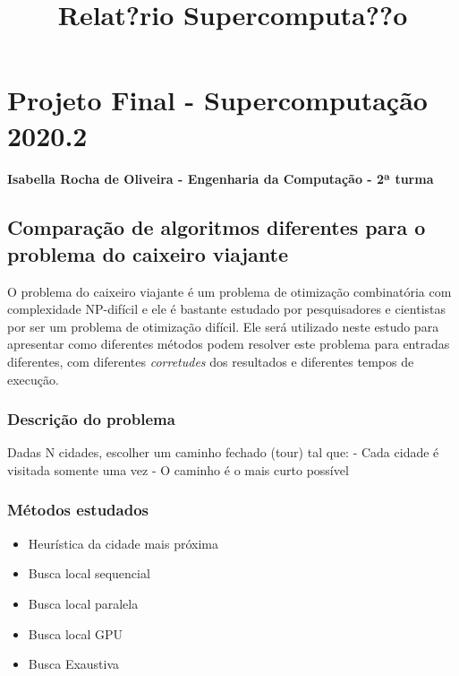 \documentclass[11pt]{article}
\title{Relat?rio Supercomputa??o}
\providecommand{\tightlist}{%
      \setlength{\itemsep}{0pt}\setlength{\parskip}{0pt}}
\begin{document}
    
    
    \maketitle
    
    

    
    \section{Projeto Final - Supercomputação
2020.2}\label{projeto-final---supercomputauxe7uxe3o-2020.2}

\paragraph{Isabella Rocha de Oliveira - Engenharia da Computação - 2ª
turma}\label{isabella-rocha-de-oliveira---engenharia-da-computauxe7uxe3o---2uxaa-turma}

\subsection{Comparação de algoritmos diferentes para o problema do
caixeiro
viajante}\label{comparauxe7uxe3o-de-algoritmos-diferentes-para-o-problema-do-caixeiro-viajante}

O problema do caixeiro viajante é um problema de otimização combinatória
com complexidade NP-difícil e ele é bastante estudado por pesquisadores
e cientistas por ser um problema de otimização difícil. Ele será
utilizado neste estudo para apresentar como diferentes métodos podem
resolver este problema para entradas diferentes, com diferentes
\emph{corretudes} dos resultados e diferentes tempos de execução.

\subsubsection{Descrição do problema}\label{descriuxe7uxe3o-do-problema}

Dadas N cidades, escolher um caminho fechado (tour) tal que: - Cada
cidade é visitada somente uma vez - O caminho é o mais curto possível

\subsubsection{Métodos estudados}\label{muxe9todos-estudados}

\begin{itemize}
\tightlist
\item
  Heurística da cidade mais próxima
\item
  Busca local sequencial
\item
  Busca local paralela
\item
  Busca local GPU
\item
  Busca Exaustiva
\end{itemize}
\end{document}
